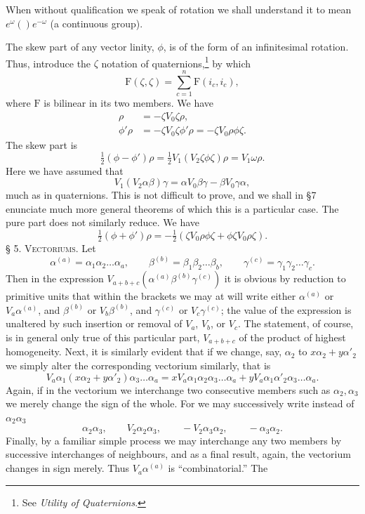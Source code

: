 \documentclass[11pt]{article}
\begin{document}
\indent When without qualification we speak of rotation we shall understand it to mean $e^\omega()e^{-\omega}$ (a continuous group).

\indent The skew part of any vector linity, $\phi$, is of the form of an infinitesimal rotation. Thus, introduce the $\zeta$ notation of quaternions,\footnote{See \emph{Utility of Quaternions}.} by which
\begin{equation}\mathrm F(\zeta,\zeta)=\sum_{c=1}^n\mathrm F(i_c,i_c),\tag{7}\end{equation}
where $\mathrm F$ is bilinear in its two members. We have
\begin{align}\rho&=-\zeta V_0\zeta\rho,\tag{8}\\\phi'\rho&=-\zeta V_0\zeta\phi'\rho=-\zeta V_0\rho\phi\zeta.\tag{9}\end{align}
The skew part is
\begin{equation}\tfrac12(\phi-\phi')\rho=\tfrac12V_1(V_2\zeta\phi\zeta)\rho=V_1\omega\rho.\tag{10}\end{equation}
Here we have assumed that
\[V_1(V_2\alpha\beta)\gamma=\alpha V_0\beta\gamma-\beta V_0\gamma\alpha,\]
much as in quaternions. This is not difficult to prove, and we shall in §7 enunciate much more general theorems of which this is a particular case. The pure part does not similarly reduce. We have
\begin{equation}\tfrac12(\phi+\phi')\rho=-\tfrac12(\zeta V_0\rho\phi\zeta+\phi\zeta V_0\rho\zeta).\tag{11}\end{equation}
\noindent\textsc{§ 5. Vectoriums.} Let
\[\alpha^{(a)}=\alpha_1\alpha_2\ldots\alpha_a,\qquad\beta^{(b)}=\beta_1\beta_2\ldots\beta_b,\qquad\gamma^{(c)}=\gamma_1\gamma_2\ldots\gamma_c.\]
Then in the expression $V_{a+b+c}(\alpha^{(a)}\beta^{(b)}\gamma^{(c)})$ it is obvious by reduction to primitive units that within the brackets we may at will write either $\alpha^{(a)}$ or $V_a\alpha^{(a)}$, and $\beta^{(b)}$ or $V_b\beta^{(b)}$, and $\gamma^{(c)}$ or $V_c\gamma^{(c)}$; the value of the expression is unaltered by such insertion or removal of $V_a$, $V_b$, or $V_c$. The statement, of course, is in general only true of this particular part, $V_{a+b+c}$ of the product of highest homogeneity. Next, it is similarly evident that if we change, say, $\alpha_2$ to $x\alpha_2+y\alpha'_2$ we simply alter the corresponding vectorium similarly, that is
\[V_a\alpha_1(x\alpha_2+y\alpha'_2)\alpha_3\ldots\alpha_a=xV_a\alpha_1\alpha_2\alpha_3\ldots\alpha_a+yV_a\alpha_1\alpha'_2\alpha_3\ldots\alpha_a.\]
Again, if in the vectorium we interchange two consecutive members such as $\alpha_2,\alpha_3$ we merely change the sign of the whole. For we may successively write instead of $\alpha_2\alpha_3$
\[\alpha_2\alpha_3,\qquad V_2\alpha_2\alpha_3,\qquad-V_2\alpha_3\alpha_2,\qquad-\alpha_3\alpha_2.\]
Finally, by a familiar simple process we may interchange any two members by successive interchanges of neighbours, and as a final result, again, the vectorium changes in sign merely. Thus $V_a\alpha^{(a)}$ is ``combinatorial.'' The
\end{document}
